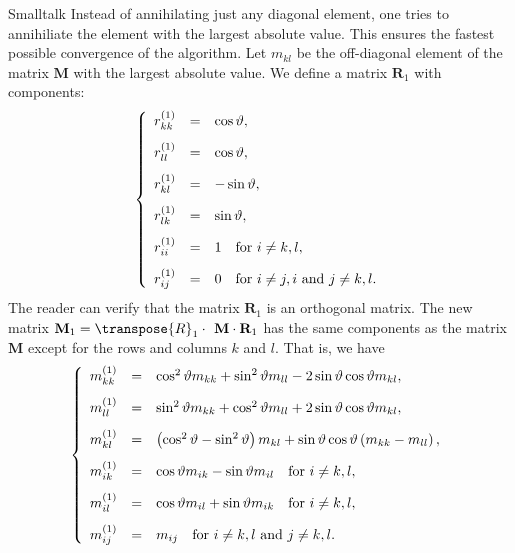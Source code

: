 \begin{displaycode}{Smalltalk}
Instead of annihilating just any diagonal element, one tries to
annihiliate the element with the largest absolute value. This
ensures the fastest possible convergence of the algorithm. Let
$m_{kl}$ be the off-diagonal element of the matrix $\textbf{M}$ with
the largest absolute value. We define a matrix $\textbf{R}_1$ with
components:
\begin{equation}
  \left\{
  \begin{array}{lcl}
    r^{\left(1\right)}_{kk} &=& \cos\vartheta, \\*[2ex]
    r^{\left(1\right)}_{ll} &=& \cos\vartheta, \\*[2ex]
    r^{\left(1\right)}_{kl} &=& -\sin\vartheta, \\*[2ex]
    r^{\left(1\right)}_{lk} &=& \sin\vartheta, \\*[2ex]
    r^{\left(1\right)}_{ii} &=& 1\mbox{\quad for $i\ne k,l$}, \\*[2ex]
    r^{\left(1\right)}_{ij} &=& 0\mbox{\quad for $i\ne j, i$ and $j \ne k,l$.}
  \end{array}
  \right.
\end{equation}
The reader can verify that the matrix $\textbf{R}_1$ is an orthogonal
matrix. The new matrix $\textbf{M}_1=\transpose{R}_1\cdot\textbf{
M}\cdot\textbf{R}_1$ has the same components as the matrix $\textbf{M}$
except for the rows and columns $k$ and $l$. That is, we have
\begin{equation}
\label{eq:jacobistep}
  \left\{
  \begin{array}{lcl}
    m^{\left(1\right)}_{kk} &=& \cos^2\vartheta m_{kk}+\sin^2\vartheta m_{ll} - 2\sin\vartheta\cos\vartheta m_{kl}, \\*[2ex]
    m^{\left(1\right)}_{ll} &=& \sin^2\vartheta m_{kk}+\cos^2\vartheta m_{ll} + 2\sin\vartheta\cos\vartheta m_{kl}, \\*[2ex]
    m^{\left(1\right)}_{kl} &=& \left(\cos^2\vartheta-\sin^2\vartheta\right)m_{kl}+\sin\vartheta\cos\vartheta
    \left(m_{kk}-m_{ll}\right), \\*[2ex]
    m^{\left(1\right)}_{ik} &=& \cos\vartheta m_{ik}-\sin\vartheta m_{il}\mbox{\quad for $i\ne k,l$}, \\*[2ex]
    m^{\left(1\right)}_{il} &=& \cos\vartheta m_{il}+\sin\vartheta m_{ik}\mbox{\quad for $i\ne k,l$}, \\*[2ex]
    m^{\left(1\right)}_{ij} &=& m_{ij}\mbox{\quad for $i\ne k,l$ and $j\ne k,l$}.  \end{array}
  \right.
\end{equation}

\end{displaycode}
